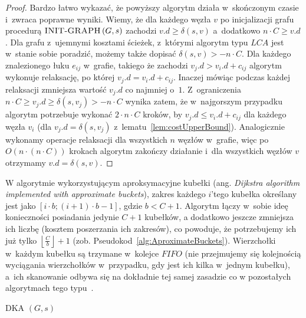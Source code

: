 \newpage
\begin{proof}
	Bardzo łatwo wykazać, że powyższy algorytm działa w~skończonym czasie i~zwraca poprawne wyniki.
	Wiemy, że dla każdego węzła $v$ po inicjalizacji grafu procedurą $\textrm{\textsc{INIT-GRAPH}} \left( G, s \right)$ zachodzi $v.d \geqslant \delta \left( s, v \right)$ a~dodatkowo $n \cdot C \geqslant v.d$.
	Dla grafu z~ujemnymi kosztami ścieżek, z~którymi algorytm typu $LCA$ jest w~stanie sobie poradzić, możemy także dopisać $\delta \left( s, v \right) > - n \cdot C$.
	Dla każdego znalezionego łuku $e_{ij}$ w~grafie, takiego że zachodzi $v_{j}.d > v_{i}.d + c_{ij}$ algorytm wykonuje relaksację, po której $v_{j}.d = v_{i}.d + c_{ij}$.
	Inaczej mówiąc podczas każdej relaksacji zmniejsza wartość $v_{j}.d$ co najmniej o~$1$.
	Z~ograniczenia $n \cdot C \geqslant v_{j}.d \geqslant \delta \left( s, v_{j} \right) > - n \cdot C$ wynika zatem, że w~najgorszym przypadku algorytm potrzebuje wykonać $2 \cdot n \cdot C$ kroków, by $v_{j}.d \leqslant v_{i}.d + c_{ij}$ dla każdego węzła $v_{i}$ (dla $v_{j}.d = \delta \left( s, v_{j} \right)$ z~lematu~\ref{lem:costUpperBound}).
	Analogicznie wykonamy operacje relaksacji dla wszystkich $n$ węzłów w~grafie, więc po $O \left( n \cdot \left( n \cdot C \right) \right)$ krokach algorytm zakończy działanie i~dla wszystkich węzłów $v$ otrzymamy $v.d = \delta \left( s, v \right)$.
\end{proof}

W algorytmie wykorzystującym aproksymacyjne kubełki (ang. \textit{Dijkstra algorithm implemented with approximate buckets}), zakres każdego $i$'tego kubełka określany jest jako $\left[ i \cdot b ; \left( i + 1 \right) \cdot b - 1 \right]$, gdzie $b < C + 1$.
Algorytm łączy w~sobie ideę konieczności posiadania jedynie $C+1$ kubełków, a dodatkowo jeszcze zmniejsza ich liczbę (kosztem poszerzania ich zakresów), co powoduje, że potrzebujemy ich już tylko $\left \lfloor \frac{C}{b} \right \rfloor + 1$ (zob. Pseudokod~\ref{alg:AproximateBuckets}).
Wierzchołki w~każdym kubełku są trzymane w~kolejce $FIFO$ (nie przejmujemy się kolejnością wyciągania wierzchołków w~przypadku, gdy jest ich kilka w~jednym kubełku), a~ich skanowanie odbywa się na dokładnie tej samej zasadzie co w pozostałych algorytmach tego typu~\cite[$23$--$24$]{Dissertation}.

\begin{pseudokod}[!htbp]
	\DontPrintSemicolon
	\caption{
		DKA $\left( G, s \right)$
	}
	\label{alg:AproximateBuckets}
\end{pseudokod}


